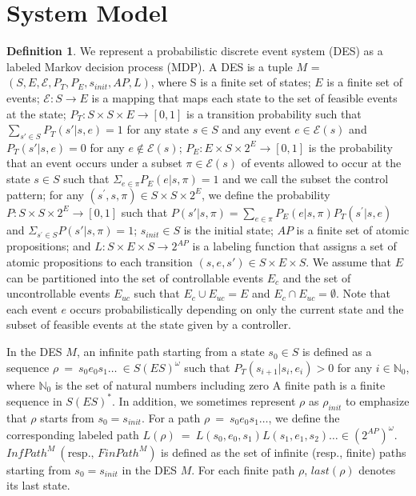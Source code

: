 \documentclass[10 pt, dvipdfmx]{article}
\theoremstyle{definition}
\newtheorem{definition}{Definition}[section]
\begin{document}
\section{System Model}

\begin{definition}
We represent a probabilistic discrete event system (DES) as a labeled Markov decision process (MDP). A DES is a tuple $M$ = $(S, E, \mathcal{E}, P_T, P_E, s_{init}, AP, L)$, where S is a finite set of states; $E$ is a finite set of events; $\mathcal{E} : S \rightarrow E$ is a mapping that maps each state to the set of feasible events at the state; $P_T:S \times S \times E \rightarrow [0,1]$ is a transition probability such that $\sum_{s' \in S} P_T(s'|s,e) = 1$ for any state $s \in S$ and any event $e \in \mathcal{E}(s) $ and $P_T(s'|s,e) = 0$ for any $e \notin \mathcal{E}(s)$; $P_E : E \times S \times 2^E \rightarrow [0,1]$ is the probability that an event occurs under a subset $\pi \in \mathcal{E}(s)$ of events allowed to occur at the state $s \in S$ such that $\Sigma_{e \in \pi} P_E(e|s,\pi) = 1$ and we call the subset the control pattern; for any $(s^{\prime}, s, \pi) \in S \times S \times 2^E$, we define the probability $P : S \times S \times 2^{E} \rightarrow [0,1]$ such that $P(s'|s,\pi) = \sum_{e \in \pi}P_E(e|s,\pi) P_T(s^{\prime}|s,e)$ and $\Sigma_{s^{\prime} \in S} P(s'|s,\pi) = 1$; $s_{init} \in S$ is the initial state; $AP$ is a finite set of atomic propositions; and $L : S \times E \times S \rightarrow 2^{AP}$ is a labeling function that assigns a set of atomic propositions to each transition $(s, e, s') \in S \times E \times S$. We assume that $E$ can be partitioned into the set of controllable events $E_c$ and the set of uncontrollable events $E_{uc}$ such that $E_c \cup E_{uc} = E$ and $E_c \cap E_{uc} = \emptyset$. Note that each event $e$ occurs probabilistically depending on only the current state and the subset of feasible events at the state given by a controller.

In the DES $M$, an infinite path starting from a state $s_0 \in S$ is defined as a sequence $\rho\ =\ s_0e_0s_1 \ldots\ \in S (E S)^{\omega}$ such that $P_T(s_{i+1}|s_i, e_i) > 0$ for any $ i \in \mathbb{N}_0$, where $\mathbb{N}_0$ is the set of natural numbers including zero A finite path is a finite sequence in $S (E S)^*$. In addition, we sometimes represent $\rho$ as $\rho_{init}$ to emphasize that $\rho$ starts from $s_0 = s_{init}$.
For a path $\rho\ =\ s_0e_0s_1 \ldots$, we define the corresponding labeled path $L(\rho)\ =\ L(s_0,e_0,s_1)L(s_1,e_1,s_2) \ldots \in (2^{AP})^{\omega}$.
 $InfPath^{M}\ ( \text{resp., }FinPath^{M})$ is defined as the set of infinite (resp., finite) paths starting from $s_0=s_{init}$ in the DES $M$. For each finite path $\rho$, $last(\rho)$ denotes its last state.
\end{definition}
\end{document}
